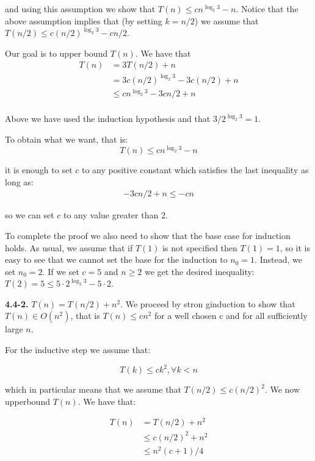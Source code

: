 \documentclass{article}
\newcommand{\Oh}{O}
\renewcommand{\leq}{\leqslant}
\renewcommand{\geq}{\geqslant}
\begin{document}
and using this assumption we show that $T(n) \leq cn^{\log_2 3} - n$. Notice that the above assumption implies that (by setting $k = n/2$) we assume that $T(n/2) \leq c(n/2)^{\log_2{3}} - cn/2$.

Our goal is to upper bound $T(n)$. We have that
\begin{equation*}
\begin{split}
T(n) &= 3T(n/2)+n \\
	 &= 3c(n/2)^{\log_2 3} - 3c(n/2) + n \\
	 & \leq cn^{\log_2 3} - 3cn / 2 + n \\
\end{split}
\end{equation*}

Above we have used the induction hypothesis and that  $3/2^{\log_2 3} = 1$.

To obtain what we want, that is:
\begin{equation*}
	T(n) \leq cn^{\log_2 3} - n
\end{equation*}

it is enough to set $c$ to any positive constant which satisfies the last inequality as long as:
\begin{align*}
	- 3cn / 2 + n \leq -cn
\end{align*}

so we can set $c$ to any value greater than $2$.

To complete the proof we also need to show that the base case for induction holds. As usual, we assume that if $T(1)$ is not specified then $T(1) = 1$, so it is easy to see that we cannot set the base for the induction to $n_0 = 1$. Instead, we set $n_0 = 2$. If we set $c = 5$ and $n \geq 2$ we get the desired inequality: $T(2) = 5 \leq 5 \cdot 2^{\log_2 3} - 5\cdot2$.


\noindent\textbf{4.4-2.} $T(n) = T(n / 2) + n^2$. We proceed by stron ginduction to show that $T(n) \in \Oh(n^2)$, that is $T(n) \leq cn^2$ for a well chosen c and for all sufficiently large $n$.

For the inductive step we assume that:

\begin{equation*}
\label{eq-second}
T(k) \leq ck^2, \forall k < n
\end{equation*}

which in particular means that we assume that $T(n/2) \leq c(n/2)^2$. We now upperbound $T(n)$. We have that:

\begin{equation*}
\label{eq-v1}
\begin{split}
T(n) &= T(n/2) + n^2 \\
	 & \leq c(n/2)^{2} + n^2 \\
	 & \leq n^2(c+1)/4 \\
\end{split}
\end{equation*}
\end{document}

